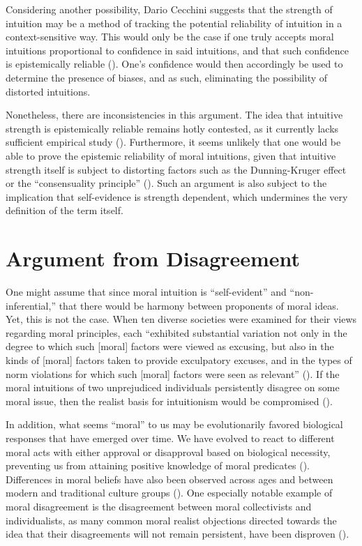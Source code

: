 \documentclass[12pt, a4paper, twoside]{article}
\begin{document}
Considering another possibility, Dario Cecchini suggests that the strength of intuition may be a method of tracking the potential reliability of intuition in a context-sensitive way. This would only be the case if one truly accepts moral intuitions proportional to confidence in said intuitions, and that such confidence is epistemically reliable (\cite[p.\ 11]{cecchini2024reliability}). One’s confidence would then accordingly be used to determine the presence of biases, and as such, eliminating the possibility of distorted intuitions. 

Nonetheless, there are inconsistencies in this argument. The idea that intuitive strength is epistemically reliable remains hotly contested, as it currently lacks sufficient empirical study (\cite[p.\ 22]{cecchini2024reliability}). Furthermore, it seems unlikely that one would be able to prove the epistemic reliability of moral intuitions, given that intuitive strength itself is subject to distorting factors such as the Dunning-Kruger effect or the “consensuality principle” (\cites[pp.\ 23–24]{cecchini2024reliability}[pp.\ 259–262]{dunning2011kruger}{koriat2012self}). Such an argument is also subject to the implication that self-evidence is strength dependent, which undermines the very definition of the term itself. 

\section{Argument from Disagreement}

One might assume that since moral intuition is “self-evident” and “non-inferential,” that there would be harmony between proponents of moral ideas. Yet, this is not the case. When ten diverse societies were examined for their views regarding moral principles, each “exhibited substantial variation not only in the degree to which such [moral] factors were viewed as excusing, but also in the kinds of [moral] factors taken to provide exculpatory excuses, and in the types of norm violations for which such [moral] factors were seen as relevant” (\cite[p.\ 4692]{barrett2016small}). If the moral intuitions of two unprejudiced individuals persistently disagree on some moral issue, then the realist basis for intuitionism would be compromised (\cites[pp.\ 208–210]{sidgwick1907methods}[p.\ 44]{shaferlandau2004good}).

In addition, what seems “moral” to us may be evolutionarily favored biological responses that have emerged over time. We have evolved to react to different moral acts with either approval or disapproval based on biological necessity, preventing us from attaining positive knowledge of moral predicates (\cites[p.\ 348]{singer2009ethics}[p.\ 72]{joyce2007evolution}{morton2016new}). Differences in moral beliefs have also been observed across ages and between modern and traditional culture groups (\cite{nisan1987moral}). One especially notable example of moral disagreement is the disagreement between moral collectivists and individualists, as many common moral realist objections directed towards the idea that their disagreements will not remain persistent, have been disproven (\cite[pp.\ 855–864]{goldman2022right}).
\end{document}
